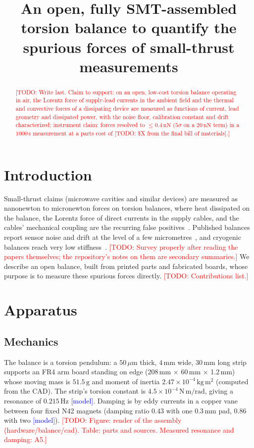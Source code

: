 \documentclass[11pt]{article}
\title{An open, fully SMT-assembled torsion balance to quantify the spurious forces of small-thrust measurements}
\author{\todo{authors and affiliations}}
\date{\todo{date}}
\newcommand{\todo}[1]{\textcolor{red}{[TODO: #1]}}
\newcommand{\model}{\textcolor{blue}{[model]}}
\begin{document}
\maketitle

\begin{abstract}
\todo{Write last. Claim to support: on an open, low-cost torsion balance operating in air, the Lorentz force of supply-lead currents in the ambient field and the thermal and convective forces of a dissipating device are measured as functions of current, lead geometry and dissipated power, with the noise floor, calibration constant and drift characterized; instrument claim: forces resolved to $\le 0.4\,\mathrm{nN}$ ($5\sigma$ on a $20\,\mathrm{nN}$ term) in a $1000\,\mathrm{s}$ measurement at a parts cost of \todo{\$X from the final bill of materials}.}
\end{abstract}

\section{Introduction}
Small-thrust claims (microwave cavities and similar devices) are measured as nanonewton to micronewton forces on torsion balances, where heat dissipated on the balance, the Lorentz force of direct currents in the supply cables, and the cables' mechanical coupling are the recurring false positives~\cite{duif2017}. Published balances report sensor noise and drift at the level of a few micrometres~\cite{soni2013}, and cryogenic balances reach very low stiffness~\cite{cryo2022}. \todo{Survey properly after reading the papers themselves; the repository's notes on them are secondary summaries.}
We describe an open balance, built from printed parts and fabricated boards, whose purpose is to measure these spurious forces directly. \todo{Contributions list.}

\section{Apparatus}
\subsection{Mechanics}
The balance is a torsion pendulum: a $50\,\mu\mathrm{m}$ thick, $4\,\mathrm{mm}$ wide, $30\,\mathrm{mm}$ long strip supports an FR4 arm board standing on edge (208\,mm $\times$ 60\,mm $\times$ 1.2\,mm) whose moving mass is $51.5\,\mathrm{g}$ and moment of inertia $2.47\times10^{-4}\,\mathrm{kg\,m^2}$ (computed from the CAD). The strip's torsion constant is $4.5\times10^{-4}\,\mathrm{N\,m/rad}$, giving a resonance of $0.215\,\mathrm{Hz}$ \model. Damping is by eddy currents in a copper vane between four fixed N42 magnets (damping ratio $0.43$ with one $0.3\,\mathrm{mm}$ pad, $0.86$ with two \model). \todo{Figure: render of the assembly (hardware/balance/cad). Table: parts and sources. Measured resonance and damping: A5.}
\end{document}
